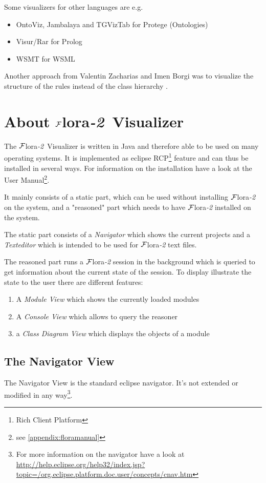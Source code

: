 \documentclass[a4paper,11pt]{article}
\newcommand{\FLORA}{{\mbox{\sc ${\cal F}${lora}\rm\emph{-2}}}\xspace}
\newcommand{\FVIZ}{{\mbox{\sc ${\cal F}${lora}\rm\emph{-2} {Visualizer}}}\xspace}
\begin{document}
Some visualizers for other languages are e.g.
\begin{itemize}
  \item OntoViz, Jambalaya and TGVizTab for Protege (Ontologies)
  \item Visur/Rar for Prolog
  \item WSMT for WSML
\end{itemize}

Another approach from Valentin Zacharias and Imen Borgi was to
visualize the structure of the rules instead of the class
hierarchy \cite{rule-base-visualization}.



\section{About \FVIZ}
\label{sec:floravisualizer}
The \FVIZ is written in Java and therefore able to be used on many operating
systems.
It is implemented as eclipse RCP\footnote{Rich Client Platform} feature and
can thus be installed in several ways. For information on the installation
have a look at the User Manual\footnote{
see \ref{appendix:floramanual}}.

It mainly consists of a static part, which can be used without installing
\FLORA on the system, and a "reasoned" part which needs to have \FLORA
installed on the system.

The static part consists of a \emph{Navigator} which shows the current
projects and a \emph{Texteditor} which is intended to be used for
\FLORA text files.

The reasoned part runs a \FLORA session in the background which is
queried to get information about the current state of the session.
To display illustrate the state to the user there are different
features:
\begin{enumerate}
	\item A \emph{Module View} which shows the currently loaded modules
	\item A \emph{Console View} which allows to query the reasoner
	\item a \emph{Class Diagram View} which displays the objects of a module
\end{enumerate}

\subsection{The Navigator View}
\label{sec:floravisualizer_navigator}
The Navigator View is the standard eclipse navigator. It's not extended
or modified in any way\footnote{
For more information on the navigator have a look at 
\url{http://help.eclipse.org/help32/index.jsp?topic=/org.eclipse.platform.doc.user/concepts/cnav.htm}}.
\end{document}
